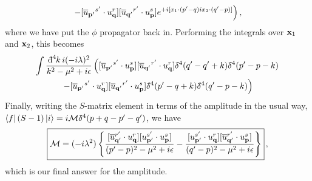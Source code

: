 \begin{example}[$\psi\psi \to \psi\psi$]
\begin{multline}
    \left. - [\overline{u}_{\vb{p}'}{}^{s'} \cdot u_{\vb{q}}^{r}][\overline{u}_{\vb{q}'}{}^{r'} \cdot u_{\vb{p}}^{s}]
    e^{+i[{x}_1 \cdot ({p}' - {q}) i {x}_2 \cdot({q}' - {p})]} \right),
  \end{multline}
  where we have put the $\phi$ propagator back in. Performing the integrals over $\vb{x}_1$ and $\vb{x}_2$, this becomes
  \begin{multline}
    \int \frac{\bdd[4]{k} i(-i \lambda)^2}{k^2 - \mu^2 + i\epsilon} \left( [\overline{u}_{\vb{p}'}{}^{s'} \cdot u_{\vb{p}}^{s}] [\overline{u} _{\vb{q}'}{}^{r'} \cdot u_{\vb{q}}^{r}] \bdelta^4(q' - q' + k) \bdelta^4(p' - p - k)\right. \\
    \left. - [\overline{u}_{\vb{p}'}{}^{s'} \cdot u_{\vb{q}}^{r}] [{\overline{u} _{\vb{q}'}{}^{r'} \cdot u_{\vb{p}}^{s}}] \bdelta^4(p' - q + k) \bdelta^4(q' - p - k) \right)
  \end{multline}
  Finally, writing the $S$-matrix element in terms of the amplitude in the usual way, $\bra{f}(S-1)\ket{i} = i \mathcal{M} \bdelta^4(p + q - p' -q')$, we have
  \begin{equation}
    \boxed{\mathcal{M} = (-i \lambda^2) \left\{ \frac{[\overline{u}{}^{r'}_{\vb{q}'} \cdot u_{\vb{q}}^{r}][u_{\vb{p}'}^{s'} \cdot u_{\vb{p}}^{s}]}{(p' - p)^2 - \mu^2 + i \epsilon} - \frac{[u_{\vb{p}'}^{s'} \cdot u_{\vb{q}}^{r}][\overline{u}{}^{r'}_{\vb{q}'} \cdot u_{\vb{p}}^{s}]}{(q' - p)^2 - \mu^2 + i \epsilon} \right\}} \, ,
  \end{equation}
  which is our final answer for the amplitude.
\end{example}
